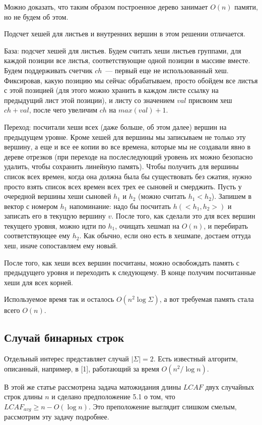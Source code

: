 {Можно доказать, что таким образом построенное дерево занимает $O(n)$ памяти, но не будем об этом.

Подсчет хешей для листьев и внутренних вершин в этом решении отличается.

База: подсчет хешей для листьев. Будем считать хеши листьев группами, для каждой позиции все листья, соответствующие одной позиции в массиве вместе. Будем поддерживать счетчик $ch$~--- первый еще не использованный хеш. Фиксировав, какую позицию мы сейчас обрабатываем, просто обойдем все листья с этой позицией (для этого можно хранить в каждом листе ссылку на предыдущий лист этой позиции), и листу со значением $val$ присвоим хеш $ch+val$, после чего увеличим $ch$ на $max(val)+1$.

Переход: посчитали хеши всех (даже больше, об этом далее) вершин на предыдущем уровне. Кроме хешей для вершины мы записываем не только эту вершину, а еще и все ее копии во все времена, которые мы не создавали явно в дереве отрезков (при переходе на послеследующий уровень их можно безопасно удалить, чтобы сохранить линейную память). Чтобы получить для вершины список всех времен, когда она должна была бы существовать без сжатия, нужно просто взять список всех времен всех трех ее сыновей и смерджить. Пусть у очередной вершины хеши сыновей $h_1$ и $h_2$ (можно считать $h_1 < h_2$). Запишем в вектор с номером $h_1$ напоминание: надо бы посчитать $h(<h_1, h_2>)$ и записать его в текущую вершину $v$. После того, как сделали это для всех вершин текущего уровня, можно идти по $h_1$, очищать хешмап на $O(n)$, и перебирать соответствующее ему $h_2$. Как обычно, если оно есть в хешмапе, достаем оттуда хеш, иначе сопоставляем ему новый. 

После того, как хеши всех вершин посчитаны, можно освобождать память с предыдущего уровня и переходить к следующему. В конце получим посчитанные хеши для всех корней.

Используемое время так и осталось $O(n^2 \log \Sigma)$, а вот требуемая память стала всего $O(n)$.
}

\subsection{Случай бинарных строк}
Отдельный интерес представляет случай $|\Sigma|=2$. Есть известный алгоритм, описанный, например, в [1], работающий за время $O(n^2/\log n)$.

В этой же статье рассмотрена задача матожидания длины $LCAF$ двух случайных строк длины $n$ и сделано предположение 5.1 о том, что $LCAF_{avg} \ge n - O(\log n)$. Это преположение выглядит слишком смелым, рассмотрим эту задачу подробнее.

